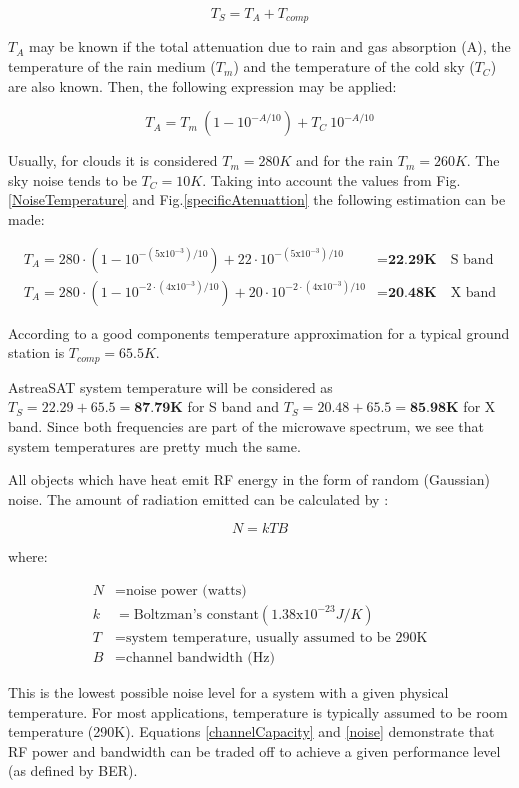\begin{equation}
T_S=T_A+T_{comp}
\end{equation}

$T_A$ may be known if the total attenuation due to rain and gas absorption (A), the temperature of the rain medium ($T_m$) and the temperature of the cold sky ($T_C$) are also known. Then, the following expression may be applied:

\begin{equation}
	T_A=T_m\ (1-10^{-A/10})+T_C\ 10^{-A/10}
\end{equation}

Usually, for clouds it is considered $T_m=280K$ and for the rain $T_m=260K$. The sky noise tends to be $T_C=10K$. Taking into account the values from Fig.\ref{NoiseTemperature} and Fig.\ref{specificAtenuattion} the following estimation can be made:

\begin{align*}
	T_A=280\cdot (1-10^{-(5\mathrm{x}10^{-3})/10})+22\cdot 10^{-(5\mathrm{x}10^{-3})/10}&=\textbf{22.29K} \quad \text{S band} \\
	T_A=280\cdot (1-10^{-2\cdot(4\mathrm{x}10^{-3})/10})+20\cdot 10^{-2\cdot(4\mathrm{x}10^{-3})/10}&=\textbf{20.48K} \quad \text{X band} 
\end{align*}

According to \cite{Jorge2012} a good components temperature approximation for a typical ground station is $T_{comp}=65.5K$.

AstreaSAT system temperature will be considered as $T_S=22.29+65.5=\textbf{87.79K}$ for S band and $T_S=20.48+65.5=\textbf{85.98K}$ for X band. Since both frequencies are part of the microwave spectrum, we see that system temperatures are pretty much the same.

All objects which have heat emit RF energy in the form of random (Gaussian) noise. The amount of radiation emitted can be calculated by \cite{Note1998}:

\begin{equation}
N=kTB
\label{noise}
\end{equation}

where:

\begin{align*}
	N&= \text{noise power (watts)}\\
	k&= \text{Boltzman's constant}(1.38\mathrm{x}10^{-23}J/K)\\
	T&= \text{system temperature, usually assumed to be 290K}\\
	B&= \text{channel bandwidth (Hz)}
\end{align*}

This is the lowest possible noise level for a system with a given physical temperature. For most applications, temperature is typically assumed to be room temperature (290K). Equations \ref{channelCapacity} and \ref{noise} demonstrate that RF power and bandwidth can be traded off to achieve a given performance level (as defined by BER). \cite{Note1998}